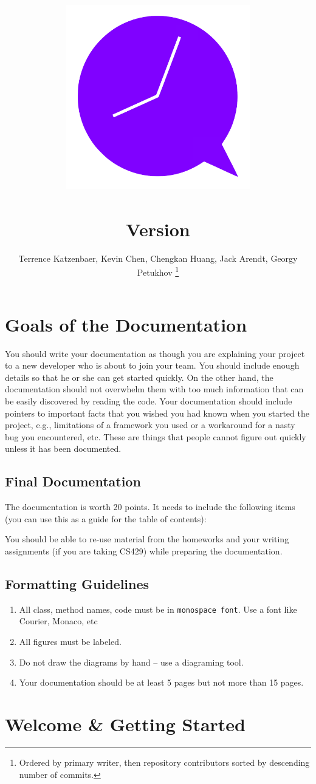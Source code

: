 \documentclass[11pt, titlepage]{article} %
\title{
\includegraphics[width=8cm]{icon}\\
\kDocTitle\\
\large{Version \kDocVersion}
}
\author{
	Terrence Katzenbaer, Kevin Chen, Chengkan Huang, Jack Arendt, Georgy Petukhov
	\footnote{Ordered by primary writer, then repository contributors sorted by descending number of commits.}
}
\begin{document}
\maketitle
\tableofcontents

\clearpage
\section{Goals of the Documentation}
You should write your documentation as though you are explaining your project to a new developer who is about to join your team. You should include enough details so that he or she can get started quickly. On the other hand, the documentation should not overwhelm them with too much information that can be easily discovered by reading the code.
Your documentation should include pointers to important facts that you wished you had known when you started the project, e.g., limitations of a framework you used or a workaround for a nasty bug you encountered, etc. These are things that people cannot figure out quickly unless it has been documented.

\subsection{Final Documentation}
The documentation is worth 20 points. It needs to include the following items (you can use this as a guide for the table of contents):

You should be able to re-use material from the homeworks and your writing assignments (if you are taking CS429) while preparing the documentation.

\subsection{Formatting Guidelines}
\begin{enumerate}
\item All class, method names, code must be in \texttt{monospace font}. Use a font like Courier, Monaco, etc
\item All figures must be labeled.
\item Do not draw the diagrams by hand – use a diagraming tool.
\item Your documentation should be at least 5 pages but not more than 15 pages.
\end{enumerate}

\clearpage
\section{Welcome \& Getting Started}

\end{document}
